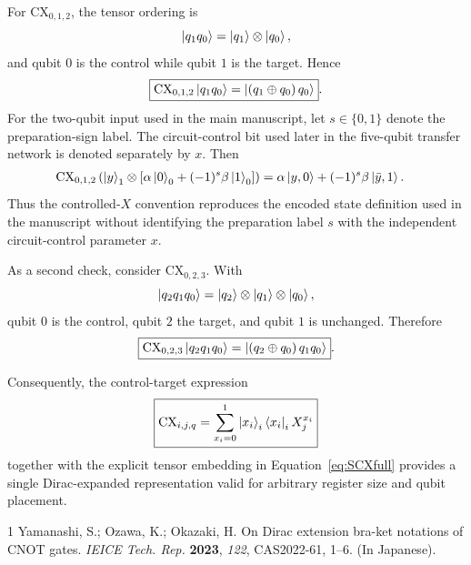 \documentclass[11pt,a4paper]{article}
\newcommand{\CX}{\mathrm{CX}}
\begin{document}
For $\CX_{0,1,2}$, the tensor ordering is
\begin{equation}
\ket{q_1q_0}=\ket{q_1}\otimes\ket{q_0},
\end{equation}
and qubit $0$ is the control while qubit $1$ is the target.  Hence
\begin{equation}
\boxed{\CX_{0,1,2}\ket{q_1q_0}=\ket{(q_1\oplus q_0)\,q_0}}.
\label{eq:SCX01}
\end{equation}
For the two-qubit input used in the main manuscript, let $s\in\{0,1\}$ denote the preparation-sign label. The circuit-control bit used later in the five-qubit transfer network is denoted separately by $x$. Then
\begin{align}
\CX_{0,1,2}
\left(
\ket{y}_1\otimes
\left[\alpha\ket{0}_0+(-1)^s\beta\ket{1}_0\right]
\right)
&=
\alpha\ket{y,0}+(-1)^s\beta\ket{\bar y,1}.
\label{eq:SBxy}
\end{align}
Thus the controlled-$X$ convention reproduces the encoded state definition used in the manuscript without identifying the preparation label $s$ with the independent circuit-control parameter $x$.

As a second check, consider $\CX_{0,2,3}$.  With
\begin{equation}
\ket{q_2q_1q_0}=\ket{q_2}\otimes\ket{q_1}\otimes\ket{q_0},
\end{equation}
qubit $0$ is the control, qubit $2$ the target, and qubit $1$ is unchanged.  Therefore
\begin{equation}
\boxed{
\CX_{0,2,3}\ket{q_2q_1q_0}
=
\ket{(q_2\oplus q_0)\,q_1q_0}
}.
\label{eq:SCX02}
\end{equation}

Consequently, the control-target expression
\begin{equation}
\boxed{
\CX_{i,j,q}
=
\sum_{x_i=0}^{1}\ket{x_i}_i\bra{x_i}_i X_j^{x_i}
}
\end{equation}
together with the explicit tensor embedding in Equation~\eqref{eq:SCXfull} provides a single Dirac-expanded representation valid for arbitrary register size and qubit placement.

\begin{thebibliography}{1}
Yamanashi, S.; Ozawa, K.; Okazaki, H. On Dirac extension bra-ket notations of CNOT gates. \emph{IEICE Tech. Rep.} \textbf{2023}, \emph{122}, CAS2022-61, 1--6. (In Japanese).
\end{thebibliography}
\end{document}

